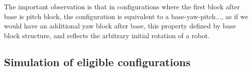 The important observation is that in configurations where the first 
block after base is pitch block, the configuration
is equivalent to a base-yaw-pitch..., as if we would have an additional yaw block after base,
this property defined by base block structure,
and reflects the arbitrary initial rotation of a robot.


\subsection{Simulation of eligible configurations}



%         
